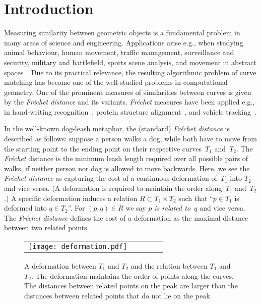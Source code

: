 \documentclass[a4paper,11pt]{article}
\begin{document}
\section{Introduction}\label{sec:intro}

	Measuring  similarity between geometric objects is a fundamental problem in many areas of science and engineering. Applications arise e.g., when studying animal behaviour, human movement, traffic management, surveillance and security, military and battlefield, sports scene analysis, and movement in abstract spaces~\cite{gudmundsson:movement,gudmundsson:gpu,gudmundsson:football}.  Due to its practical relevance, the resulting algorithmic problem of curve matching has become one of the well-studied problems in computational geometry.  One of the prominent measures of similarities between curves is given by the  \emph{Fr\'{e}chet distance} and its variants. \emph{Fr\'{e}chet}  measures have been applied e.g., in  hand-writing recognition~\cite{DBLP:conf/icdar/SriraghavendraKB07}, protein structure alignment~\cite{DBLP:journals/jbcb/JiangXZ08}, and vehicle tracking~\cite{wenk:vehicle}. 

	In the well-known dog-leash metaphor, the (standard) \emph{Fr\'{e}chet  distance} is described as follows:
suppose a person walks a dog, while both have to move from the starting point to the ending point on their respective curves~$T_1$ and~$T_2$. The \emph{Fr\'{e}chet}  distance is the minimum leash length required over all possible pairs of walks, if neither person nor dog is allowed to move backwards. Here, we see the  \emph{Fr\'{e}chet  distance} as capturing the cost of a continuous deformation of~$T_1$ into $T_2$ and vice versa. (A deformation is required to maintain the order along~$T_1$ and~$T_2$.) A specific deformation induces a relation $R \subset T_1 \times T_2$ such that ``$p \in T_1$ is deformed into $q \in T_2$''. For $(p,q) \in R$ we say \emph{$p$ is related to~$q$} and vice versa. The \emph{Fr\'{e}chet distance} defines the cost of a deformation as the maximal distance between two related points. 

	
\begin{figure}[ht]
  \begin{center}
    \begin{tabular}{ccccc}
      \texttt{[image: deformation.pdf]} & &\\
\end{tabular}
  \end{center}
  \vspace*{-12pt}
  \caption{A deformation between $T_1$ and $T_2$ and the relation between $T_1$ and $T_2$. The deformation maintains the order of points along the curves. The distances between related points on the peak are larger than the distances between related points that do not lie  on the peak.
}
  \label{fig:deformationDistanceVSintegral}
\end{figure}
	
\end{document}
